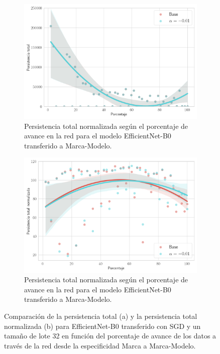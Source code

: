 \begin{figure}[H]
	\centering
	\begin{subfigure}
		{.5\textwidth}
		\centering
		\includegraphics[width=\linewidth]{img/exp_transfer_efficientnet.png}
		\caption{Persistencia total normalizada según el porcentaje de avance en la
			red para el modelo EfficientNet-B0 transferido a Marca-Modelo.}
		\label{fig:efficientnet-transfer-1}
	\end{subfigure}%
	\begin{subfigure}
		{.5\textwidth}
		\centering
		\includegraphics[width=\linewidth]{img/exp_transfer_efficientnet_norm.png}
		\caption{Persistencia total normalizada según el porcentaje de avance en la
			red para el modelo EfficientNet-B0 transferido a Marca-Modelo.}
		\label{fig:efficientnet-transfer-2}
	\end{subfigure}
	\caption{Comparación de la persistencia total (a) y la persistencia total
		normalizada (b) para EfficientNet-B0 transferido con SGD y un tamaño de lote
		32 en función del porcentaje de avance de los datos a través de la red desde
		la especificidad Marca a Marca-Modelo.}
	\label{fig:efficientnet-transfer}
\end{figure}

